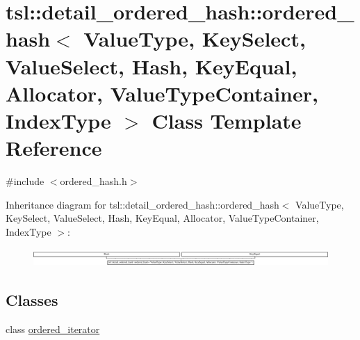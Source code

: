 \hypertarget{classtsl_1_1detail__ordered__hash_1_1ordered__hash}{}\section{tsl\+::detail\+\_\+ordered\+\_\+hash\+::ordered\+\_\+hash$<$ Value\+Type, Key\+Select, Value\+Select, Hash, Key\+Equal, Allocator, Value\+Type\+Container, Index\+Type $>$ Class Template Reference}
\label{classtsl_1_1detail__ordered__hash_1_1ordered__hash}


{\ttfamily \#include $<$ordered\+\_\+hash.\+h$>$}

Inheritance diagram for tsl\+::detail\+\_\+ordered\+\_\+hash\+::ordered\+\_\+hash$<$ Value\+Type, Key\+Select, Value\+Select, Hash, Key\+Equal, Allocator, Value\+Type\+Container, Index\+Type $>$\+:\begin{figure}[H]
\begin{center}
\leavevmode
\includegraphics[height=0.683761cm]{classtsl_1_1detail__ordered__hash_1_1ordered__hash}
\end{center}
\end{figure}
\subsection*{Classes}
\begin{DoxyCompactItemize}
\item 
class \mbox{\hyperlink{classtsl_1_1detail__ordered__hash_1_1ordered__hash_1_1ordered__iterator}{ordered\+\_\+iterator}}
\end{DoxyCompactItemize}
